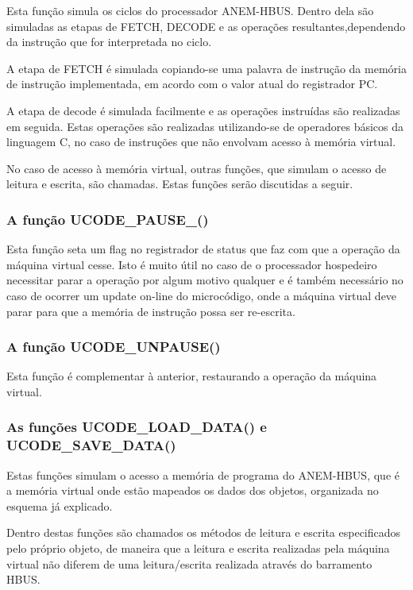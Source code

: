 \documentclass[11pt]{report}
\begin{document}
Esta função simula os ciclos do processador ANEM-HBUS. Dentro dela são simuladas as etapas de FETCH, DECODE e as operações resultantes,dependendo da instrução que for interpretada no ciclo.

A etapa de FETCH é simulada copiando-se uma palavra de instrução da memória de instrução implementada, em acordo com o valor atual do registrador PC.

A etapa de decode é simulada facilmente e as operações instruídas são realizadas em seguida. Estas operações são realizadas utilizando-se de operadores básicos da linguagem C, no caso de instruções que não envolvam acesso à memória virtual.

No caso de acesso à memória virtual, outras funções, que simulam o acesso de leitura e escrita, são chamadas. Estas funções serão discutidas a seguir.

\subsubsection{A função UCODE\_PAUSE\_()}

Esta função seta um flag no registrador de status que faz com que a operação da máquina virtual cesse. Isto é muito útil no caso de o processador hospedeiro necessitar parar a operação por algum motivo qualquer e é também necessário no caso de ocorrer um update on-line do microcódigo, onde a máquina virtual deve parar para que a memória de instrução possa ser re-escrita.

\subsubsection{A função UCODE\_UNPAUSE()}

Esta função é complementar à anterior, restaurando a operação da máquina virtual.

\subsubsection{As funções UCODE\_LOAD\_DATA() e UCODE\_SAVE\_DATA()}

Estas funções simulam o acesso a memória de programa do ANEM-HBUS, que é a memória virtual onde estão mapeados os dados dos objetos, organizada no esquema já explicado.

Dentro destas funções são chamados os métodos de leitura e escrita especificados pelo próprio objeto, de maneira que a leitura e escrita realizadas pela máquina virtual não diferem de uma leitura/escrita realizada através do barramento HBUS.
\end{document}
